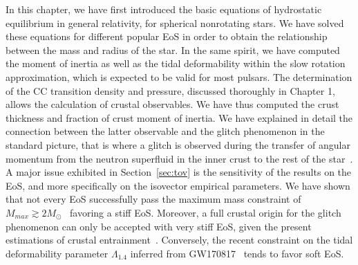 In this chapter, we have first introduced the basic equations of hydrostatic 
equilibrium in general relativity, for spherical nonrotating stars. We have
solved these equations for different popular EoS in order to obtain the
relationship between the mass and radius of the star. In the same spirit, we
have computed the moment of inertia as well as the tidal deformability within
the slow rotation approximation, which is expected to be valid for most 
pulsars. The determination of the CC transition density and pressure, discussed
thoroughly in Chapter 1, allows the calculation of crustal observables. We have 
thus computed the crust thickness and fraction of crust moment of inertia. We
have explained in detail the connection between the latter observable and the 
glitch phenomenon in the standard picture, that is where a glitch is observed 
during the transfer of angular momentum from the neutron superfluid in the
inner crust to the rest of the star~\cite{Anderson1975}. 
A major issue exhibited in Section~\ref{sec:tov} is the sensitivity of
the results on the EoS, and more specifically on the isovector empirical
parameters. We have shown that not every EoS successfully pass the maximum mass
constraint of $M_{max} \gtrsim
2M_\odot$~\cite{Demorest2010,Antoniadis2013,Cromartie2020} favoring a stiff 
EoS. 
Moreover, a full crustal origin for the glitch phenomenon can only be accepted 
with very stiff EoS, given the present estimations of crustal 
entrainment~\cite{Andersson2012,Piekarewicz2014}.
Conversely, the recent constraint on the tidal deformability parameter 
$\Lambda_{1.4}$ inferred from GW170817~\cite{GW1} tends to favor soft EoS. 

